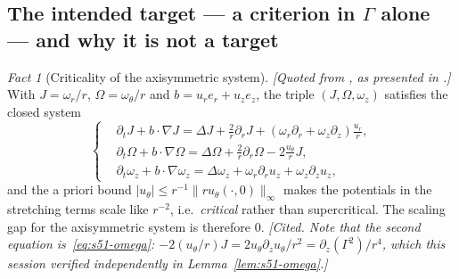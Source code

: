 \documentclass[11pt]{article}
\theoremstyle{definition}
\theoremstyle{remark}
\newtheorem{fact}[theorem]{Fact}
\begin{document}
\subsection{The intended target --- a criterion in \texorpdfstring{$\Gamma$}{Gamma}
alone --- and why it is not a target}
\label{subsec:s51-criterion}

\begin{fact}[Criticality of the axisymmetric system]\label{fact:s51-criticality}
  \emph{[Quoted from \cite{LeiZhang2017}, as presented in
  \cite[\S2.2]{ZhangReview2021}.]} With $J=\omega_r/r$, $\Omega=\omega_\theta/r$
  and $b=u_re_r+u_ze_z$, the triple $(J,\Omega,\omega_z)$ satisfies the closed
  system
  \[
    \left\{
    \begin{aligned}
      &\partial_tJ + b\cdot\nabla J
        = \Delta J + \tfrac2r\partial_rJ
          + (\omega_r\partial_r+\omega_z\partial_z)\tfrac{u_r}{r},\\
      &\partial_t\Omega + b\cdot\nabla\Omega
        = \Delta\Omega + \tfrac2r\partial_r\Omega
          - 2\tfrac{u_\theta}{r}J,\\
      &\partial_t\omega_z + b\cdot\nabla\omega_z
        = \Delta\omega_z + \omega_r\partial_ru_z+\omega_z\partial_zu_z ,
    \end{aligned}\right.
  \]
  and the a priori bound $|u_\theta|\leq r^{-1}\|ru_\theta(\cdot,0)\|_\infty$
  makes the potentials in the stretching terms scale like $r^{-2}$, i.e.\
  \emph{critical} rather than supercritical. The scaling gap for the
  axisymmetric system is therefore $0$. \emph{[Cited. Note that the second
  equation is~\eqref{eq:s51-omega}: $-2(u_\theta/r)J
  =2u_\theta\partial_zu_\theta/r^2=\partial_z(\Gamma^2)/r^4$, which this
  session verified independently in Lemma~\ref{lem:s51-omega}.]}
\end{fact}
\end{document}
